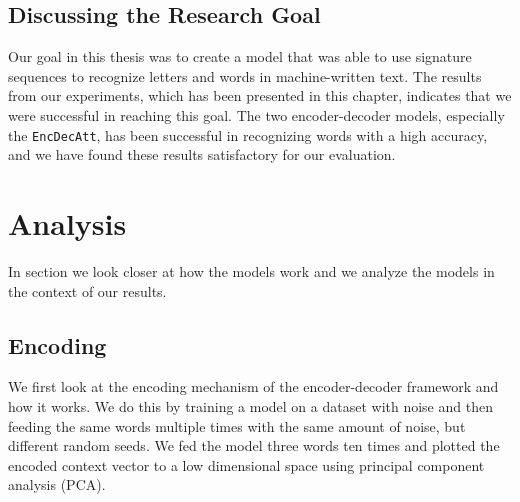 \subsection{Discussing the Research Goal}
Our goal in this thesis was to create a model that was able to use signature sequences to recognize letters and words in machine-written text. The results from our experiments, which has been presented in this chapter, indicates that we were successful in reaching this goal. The two encoder-decoder models, especially the {\tt EncDecAtt}, has been successful in recognizing words with a high accuracy, and we have found these results satisfactory for our evaluation.


\section{Analysis}
\label{sec:reasoning}
In section we look closer at how the models work and we analyze the models in the context of our results.

\subsection{Encoding}
We first look at the encoding mechanism of the encoder-decoder framework and how it works. We do this by training a model on a dataset with noise and then feeding the same words multiple times with the same amount of noise, but different random seeds. We fed the model three words ten times and plotted the encoded context vector to a low dimensional space using principal component analysis (PCA). 

